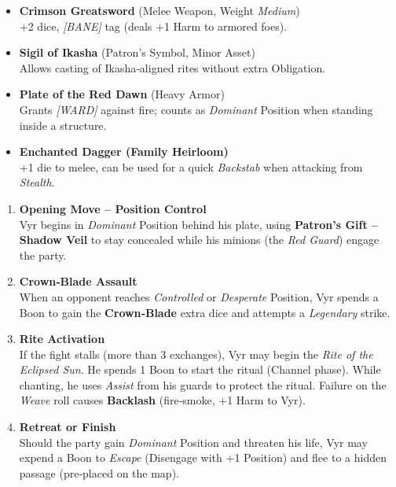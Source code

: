 \documentclass[12pt,a4paper]{article}
\begin{document}
\begin{itemize}[leftmargin=*]
    \item \textbf{Crimson Greatsword} (Melee Weapon, Weight \emph{Medium})\\
          +2 dice, \emph{[BANE]} tag (deals +1 Harm to armored foes).
    \item \textbf{Sigil of Ikasha} (Patron's Symbol, Minor Asset)\\
          Allows casting of Ikasha‑aligned rites without extra Obligation.
    \item \textbf{Plate of the Red Dawn} (Heavy Armor)\\
          Grants \emph{[WARD]} against fire; counts as \emph{Dominant}
          Position when standing inside a structure.
    \item \textbf{Enchanted Dagger (Family Heirloom)}\\
          +1 die to melee, can be used for a quick \emph{Backstab}
          when attacking from \emph{Stealth}.
\end{itemize}

\begin{enumerate}[label=\arabic*., leftmargin=*]
    \item \textbf{Opening Move -- Position Control}\\
          Vyr begins in \emph{Dominant} Position behind his plate,
          using \textbf{Patron's Gift -- Shadow Veil} to stay concealed
          while his minions (the \emph{Red Guard}) engage the party.
    \item \textbf{Crown‑Blade Assault}\\
          When an opponent reaches \emph{Controlled} or \emph{Desperate}
          Position, Vyr spends a Boon to gain the \textbf{Crown‑Blade}
          extra dice and attempts a \emph{Legendary} strike.
    \item \textbf{Rite Activation}\\
          If the fight stalls (more than 3 exchanges), Vyr may begin the
          \emph{Rite of the Eclipsed Sun}.  He spends 1 Boon to start the
          ritual (Channel phase).  While chanting, he uses \emph{Assist}
          from his guards to protect the ritual.  Failure on the \emph{Weave}
          roll causes \textbf{Backlash} (fire‑smoke, +1 Harm to Vyr).
    \item \textbf{Retreat or Finish}\\
          Should the party gain \emph{Dominant} Position and threaten his
          life, Vyr may expend a Boon to \emph{Escape} (Disengage with
          +1 Position) and flee to a hidden passage (pre‑placed on the map).
\end{enumerate}
\end{document}
